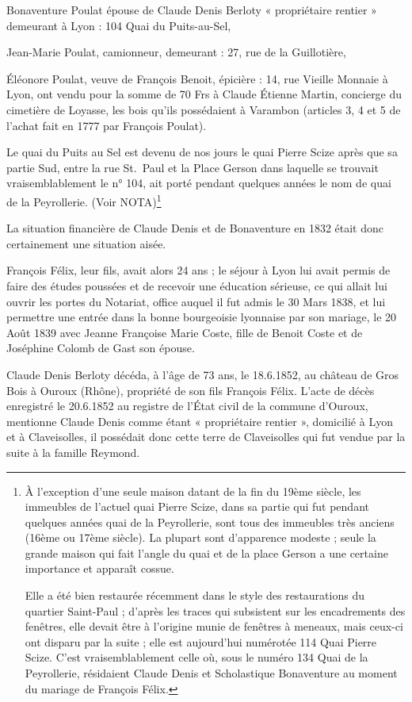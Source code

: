 \documentclass[11pt,a4paper]{report}
\begin{document}
Bonaventure Poulat épouse de Claude Denis Berloty « propriétaire rentier » demeurant à Lyon : 104 Quai du Puits-au-Sel,

Jean-Marie Poulat, camionneur, demeurant : 27, rue de la Guillotière,

Éléonore Poulat, veuve de François Benoit, épicière : 14, rue Vieille Monnaie à Lyon, ont vendu pour la somme de 70 Frs à Claude Étienne Martin, concierge du cimetière de Loyasse, les bois qu'ils possédaient à Varambon (articles 3, 4 et 5 de l'achat fait en 1777 par François Poulat).

Le quai du Puits au Sel est devenu de nos jours le quai Pierre Scize après que sa partie Sud, entre la rue St.~Paul et la Place Gerson dans laquelle se trouvait vraisemblablement le n° 104, ait porté pendant quelques années le nom de quai de la Peyrollerie. (Voir NOTA)\footnote{À l'exception d'une seule maison datant de la fin du 19ème siècle, les immeubles de l'actuel quai Pierre Scize, dans sa partie qui fut pendant quelques années quai de la Peyrollerie, sont tous des immeubles très anciens (16ème ou 17ème siècle). La plupart sont d'apparence modeste ; seule la grande maison qui fait l'angle du quai et de la place Gerson a une certaine importance et apparaît cossue.

Elle a été bien restaurée récemment dans le style des restaurations du quartier Saint-Paul ; d'après les traces qui subsistent sur les encadrements des fenêtres, elle devait être à l'origine munie de fenêtres à meneaux, mais ceux-ci ont disparu par la suite ; elle est aujourd'hui numérotée 114 Quai Pierre Scize. C'est vraisemblablement celle où, sous le numéro 134 Quai de la Peyrollerie, résidaient Claude Denis et Scholastique Bonaventure au moment du mariage de François Félix.}

La situation financière de Claude Denis et de Bonaventure en 1832 était donc certainement une situation aisée.

François Félix, leur fils, avait alors 24 ans ; le séjour à Lyon lui avait permis de faire des études poussées et de recevoir une éducation sérieuse, ce qui allait lui ouvrir les portes du Notariat, office auquel il fut admis le 30 Mars 1838, et lui permettre une entrée dans la bonne bourgeoisie lyonnaise par son mariage, le 20 Août 1839 avec Jeanne Françoise Marie Coste, fille de Benoit Coste et de Joséphine Colomb de Gast son épouse.

Claude Denis Berloty décéda, à l'âge de 73 ans, le 18.6.1852, au château de Gros Bois à Ouroux (Rhône), propriété de son fils François Félix. L'acte de décès enregistré le 20.6.1852 au registre de l'État civil de la commune d'Ouroux, mentionne Claude Denis comme étant « propriétaire rentier », domicilié à Lyon et à Claveisolles, il possédait donc cette terre de Claveisolles qui fut vendue par la suite à la famille Reymond.
\end{document}
